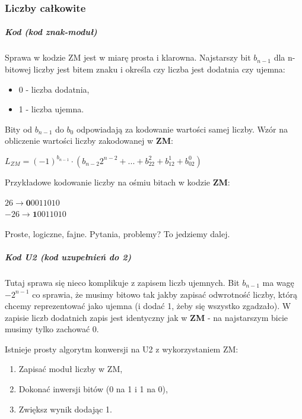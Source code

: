 \documentclass[a4paper,12pt,oneside]{book}
\begin{document}
			\subsubsection{Liczby całkowite}
			
			\subparagraph{Kod  (kod znak-moduł)}
			
			Sprawa w kodzie ZM jest w miarę prosta i klarowna. Najstarszy bit $b_{n-1}$ dla n-bitowej liczby jest bitem znaku i określa czy liczba jest dodatnia czy ujemna:
			\begin{itemize}
				\item 0 - liczba dodatnia,
				\item 1 - liczba ujemna.
			\end{itemize}
			
			Bity od $b_{n-1}$ do $b_0$ odpowiadają za kodowanie wartości samej liczby. Wzór na obliczenie wartości liczby zakodowanej w \textbf{ZM}:
			\begin{center}
				$L_{ZM} = (-1)^{b_{n-1}} \cdot (b_{n-2}2^{n-2} + ... + b_22^2 + b_12^1 + b_02^0)$
			\end{center}
			
			Przykładowe kodowanie liczby na ośmiu bitach w kodzie \textbf{ZM}:
			\begin{center}
				$26 \longrightarrow \textbf{0}0011010 $\\
				$-26 \longrightarrow \textbf{1}0011010 $
			\end{center}
			
			Proste, logiczne, fajne. Pytania, problemy? To jedziemy dalej.
			
				
			\subparagraph{Kod \textbf{U2} (kod uzupełnień do 2)}
			
			Tutaj sprawa się nieco komplikuje z zapisem liczb ujemnych. Bit $b_{n-1}$ ma wagę $-2^{n-1}$ co sprawia, że musimy bitowo tak jakby zapisać odwrotność liczby, którą chcemy reprezentować jako ujemna (i dodać 1, żeby się wszystko zgadzało). W zapisie liczb dodatnich zapis jest identyczny jak w \textbf{ZM} - na najstarszym bicie musimy tylko zachować $0$.
			
			Istnieje prosty algorytm konwersji na U2 z wykorzystaniem ZM:
			\begin{enumerate}
				\item Zapisać moduł liczby w ZM,
				\item Dokonać inwersji bitów (0 na 1 i 1 na 0),
				\item Zwiększ wynik dodając 1.
			\end{enumerate}
			
\end{document}

